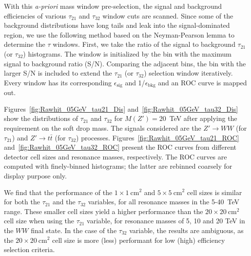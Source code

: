 With this {\it a-priori} mass window pre-selection, the signal and background efficiencies of 
various $\tau_{21}$ and $\tau_{32}$ window cuts are scanned. 
Since some of the background distributions have long tails and leak into the 
signal-dominated region, we use the following method based on the 
Neyman-Pearson lemma to determine the $\tau$ windows. 
First, we take the ratio of the signal to background $\tau_{21}$ (or $\tau_{32}$) 
histograms. The window is initialized by the bin with the maximum signal to 
background ratio (S/N).  
Comparing the adjacent bins,  the bin with the larger S/N is included  to extend the $\tau_{21}$ (or $\tau_{32}$) 
selection window iteratively.  Every window has its corresponding $\epsilon_\mathrm{sig}$ and 
1/$\epsilon_\mathrm{bkg}$ and an ROC curve is mapped out. 


Figures~\ref{fig:Rawhit_05GeV_tau21_Dis} and~\ref{fig:Rawhit_05GeV_tau32_Dis} 
show the distributions of $\tau_{21}$ and $\tau_{32}$ for $M(Z')=20$~TeV 
after applying the requirement on the soft drop mass. The signals considered are 
the $Z'\rightarrow WW$ (for $\tau_{21}$) and 
$Z' \rightarrow t\bar{t}$ (for $\tau_{32}$) processes. 
Figures~\ref{fig:Rawhit_05GeV_tau21_ROC} and~\ref{fig:Rawhit_05GeV_tau32_ROC} 
present the ROC curves from different detector cell sizes and resonance masses, 
respectively.  The ROC curves are computed with finely-binned histograms; the latter are rebinned coarsely for display purpose only.

We find that the performance of the $1\times1~\mathrm{cm}^2$ and $5\times5~\mathrm{cm}^2$ cell sizes is similar for both the $ \tau_{21} $ and the $ \tau_{32} $ variables, for
 all resonance masses in the 5-40~TeV range. These smaller cell sizes yield a higher performance than 
 the $20\times20~\mathrm{cm}^2$ cell size when using the $ \tau_{21} $ variable, for resonance masses of 5, 10 and 20 TeV in the $WW$ final state. In the case of the $ \tau_{32} $ variable, 
  the results are ambiguous, as the $20\times20~\mathrm{cm}^2$ cell size is more (less) performant for low (high) efficiency selection criteria. 

